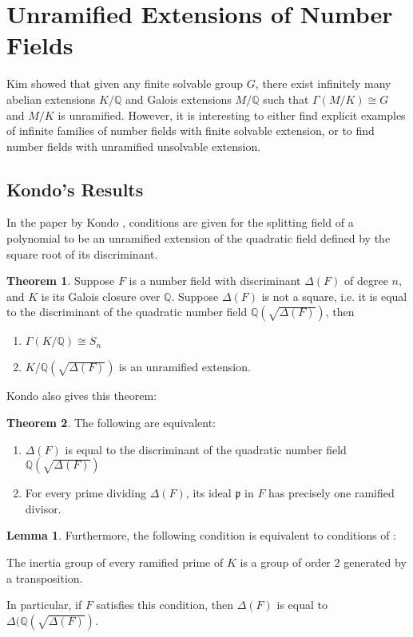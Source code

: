 \documentclass[12pt]{extarticle}
\newcommand{\Q}{\mathbb{Q}}
\newcommand{\<}{\langle}
\renewcommand{\>}{\rangle}
\theoremstyle{definition}
\newtheorem{theorem}{Theorem}
\newtheorem{lemma}{Lemma}
\begin{document}
\section{Unramified Extensions of Number Fields}
Kim \cite{KIM2015} showed that given any finite solvable group $G$, there exist infinitely many abelian extensions $K/\Q$ and Galois extensions $M/\Q$ such that $\Gamma(M/K) \cong G$ and $M/K$ is unramified. However, it is interesting to either find explicit examples of infinite families of number fields with finite solvable extension, or to find number fields with unramified unsolvable extension. 
\subsection{Kondo's Results}
In the paper by Kondo \cite{KOND}, conditions are given for the splitting field of a polynomial to be an unramified extension of the quadratic field defined by the square root of its discriminant.
\begin{theorem}
    Suppose $F$ is a number field with discriminant $\Delta(F)$ of degree $n$, and $K$ is its Galois closure over $\Q$. Suppose $\Delta(F)$ is not a square, i.e. it is equal to the discriminant of the quadratic number field $\Q(\sqrt{\Delta(F)})$, then \begin{enumerate}
        \item $\Gamma(K/\Q)\cong S_n$
        \item $K/\Q(\sqrt{\Delta(F)})$ is an unramified extension.
    \end{enumerate}
\end{theorem}
Kondo also gives this theorem:
 \begin{theorem}
 \label{thm:tfae}
    The following are equivalent: \begin{enumerate}
        \item $\Delta(F)$ is equal to the discriminant of the quadratic number field $\Q(\sqrt{\Delta(F)})$
        \item For every prime dividing $\Delta(F)$, its ideal $\mathfrak{p}$ in $F$ has precisely one ramified divisor.
    \end{enumerate}
\end{theorem}
\begin{lemma}
Furthermore, the following condition is equivalent to conditions of :
\par
    The inertia group of every ramified prime of $K$ is a group of order 2 generated by a transposition.\par

In particular, if $F$ satisfies this condition, then $\Delta(F)$ is equal to $\Delta(\Q(\sqrt{\Delta(F)})$.
\label{lem_trans}
\end{lemma}
\end{document}
